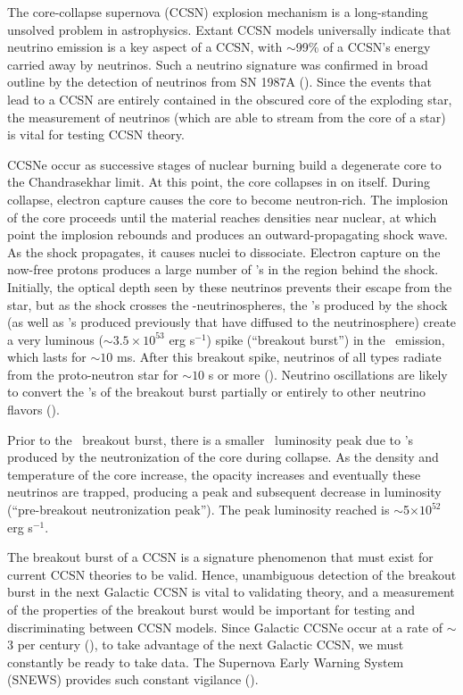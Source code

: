 The core-collapse supernova (CCSN) explosion mechanism is a
long-standing unsolved problem in astrophysics. Extant CCSN models
universally indicate that neutrino emission is a key aspect
of a CCSN, with $\sim$99\% of a CCSN's energy carried away by
neutrinos. Such a neutrino signature was confirmed in broad outline 
by the detection of 
neutrinos from SN 1987A (\citealp{bionta1987,hirata1987}).  
Since the events that lead to a CCSN 
are entirely contained 
in the obscured core of the exploding star, the measurement of neutrinos 
(which are able to stream from the core of a star) is vital for testing CCSN theory.  

CCSNe occur as successive stages of nuclear burning build a
degenerate core to the Chandrasekhar limit. At this point, the 
core collapses in on
itself.  During collapse, electron capture causes the core to become neutron-rich.
  The implosion of the core proceeds until the material reaches
densities near nuclear, at which point the implosion
rebounds and produces an outward-propagating shock wave. 
  As the shock propagates, it causes nuclei to dissociate.
Electron capture on the now-free protons produces a large
number of \nue's in the region behind the shock. Initially, the optical
depth seen by these neutrinos prevents their escape from the star, 
but as the shock crosses the \nue-neutrinospheres, the
\nue's produced by the shock (as well as \nue's produced previously 
that have diffused to the neutrinosphere) create a very
luminous (${\sim} 3.5 \times 10^{53}$ erg s$^{-1}$) spike (``breakout
burst'') in the
\nue\ emission, which lasts for ${\sim}10$ ms.  After
this breakout spike,
neutrinos of all types radiate from the proto-neutron
star for ${\sim}10$ s or more  
(\citealt{burrowslattimer1986}).  Neutrino oscillations are likely to convert
the \nue's of the breakout burst partially or entirely to other
neutrino flavors (\citealt{mirizzietal2015}).


Prior to the \nue\ breakout burst, 
there is a smaller \nue\ luminosity peak
due to \nue's produced by the neutronization of the core during
 collapse. As the density and temperature of the core increase, the
 opacity increases and eventually these neutrinos are trapped,
 producing a peak and subsequent decrease in luminosity
 (``pre-breakout neutronization peak'').  The peak
 luminosity reached is $\sim$5$\times 10^{52}$ erg s$^{-1}$. 

The breakout burst of a CCSN is a signature
phenomenon that must exist for current CCSN theories to be 
valid. Hence, unambiguous detection of the breakout burst 
in the next Galactic 
CCSN is vital to validating theory, and a measurement of 
the properties of the breakout burst
would be important for testing and discriminating between CCSN models. Since 
Galactic CCSNe occur at a rate of $\sim$3 per century 
(\citealt{adamsetal2013}),  to take advantage of the next
Galactic CCSN, we must constantly be ready to
take data.  The Supernova Early Warning System (SNEWS) provides such
constant vigilance
 (\citealp{antoniolietal2004,scholberg2008}).

